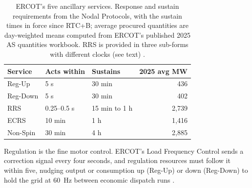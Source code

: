 \begin{table}[htbp]
  \centering
  \footnotesize
  \setlength{\tabcolsep}{4pt}
  \begin{tabular}{lllr}
    \hline
    \textbf{Service} & \textbf{Acts within} & \textbf{Sustains} & \textbf{2025 avg MW} \\
    \hline
    Reg-Up & 5 s & 30 min & 436 \\
    Reg-Down & 5 s & 30 min & 402 \\
    RRS & 0.25--0.5 s & 15 min to 1 h & 2,739 \\
    ECRS & 10 min & 1 h & 1,416 \\
    Non-Spin & 30 min & 4 h & 2,885 \\
    \hline
  \end{tabular}
  \caption{ERCOT's five ancillary services. Response and sustain requirements from the Nodal Protocols, with the sustain times in force since RTC+B; average procured quantities are day-weighted means computed from ERCOT's published 2025 AS quantities workbook. RRS is provided in three sub-forms with different clocks (see text) \autocite{ercot2026protocols,ercot2025nprr1282,potomac2026somercot,ercotasmeth2025}.} %
  \label{tab:as-products}
\end{table}

Regulation is the fine motor control. ERCOT's Load Frequency Control sends a correction signal every four seconds, and regulation resources must follow it within five, nudging output or consumption up (Reg-Up) or down (Reg-Down) to hold the grid at 60~Hz between economic dispatch runs \autocite{potomac2026somercot,ercot2026protocols}. %

